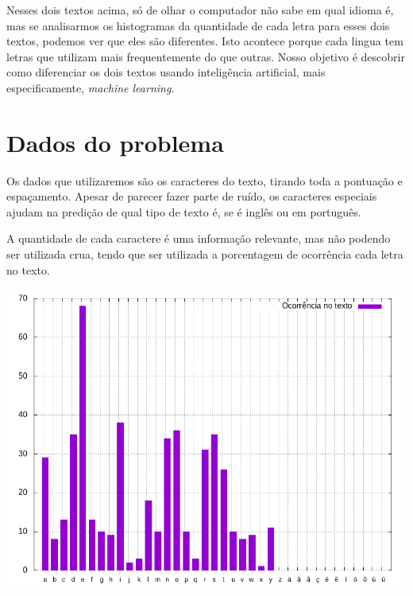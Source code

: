 \documentclass[a0,portrait]{a0poster}
\begin{document}
\begin{multicols}{2}
Nesses dois textos acima, só de olhar o computador não sabe em qual idioma é, mas se analisarmos os histogramas da quantidade de cada letra para esses dois textos, podemos ver que eles são diferentes. Isto acontece porque cada lingua tem letras que utilizam mais frequentemente do que outras. Nosso objetivo é descobrir como diferenciar os dois textos usando inteligência artificial, mais especificamente, \emph{machine learning}.

\section*{Dados do problema}
Os dados que utilizaremos são os caracteres do texto, tirando toda a pontuação e espaçamento. Apesar de parecer fazer parte de ruído, os caracteres especiais ajudam na predição de qual tipo de texto é, se é inglês ou em português.

A quantidade de cada caractere é uma informação relevante, mas não podendo ser utilizada crua, tendo que ser utilizada a porcentagem de ocorrência cada letra no texto.

\begin{center}\vspace{1cm}
    \includegraphics[width=0.8\linewidth]{freq-en.png}
\end{center}\vspace{1cm}


\end{multicols}
\end{document}
